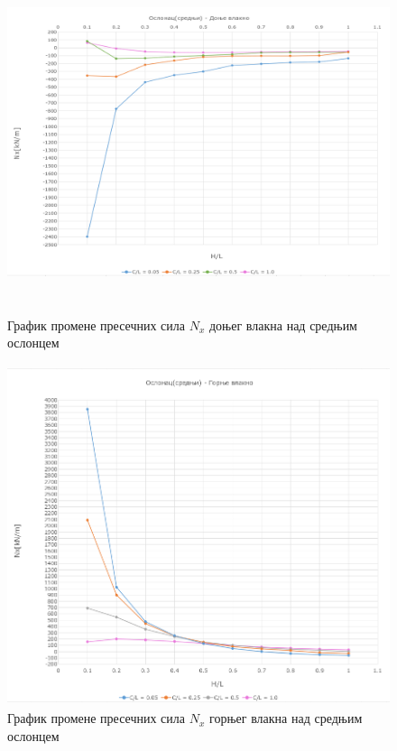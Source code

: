 \documentclass[11pt, a4paper]{article}
\begin{document}
\begin{figure}[H]
	\includegraphics[width=\textwidth, height=10cm]{Slike/Oslonac_donje.png}
	\caption{График промене пресечних сила $N_x$ доњег влакна над средњим ослонцем}
\end{figure}

\begin{figure}[H]
	\includegraphics[width=\textwidth, height=10cm]{Slike/Oslonac_gornje.png}
	\caption{График промене пресечних сила $N_x$ горњег влакна над средњим ослонцем}
\end{figure}
\end{document}

